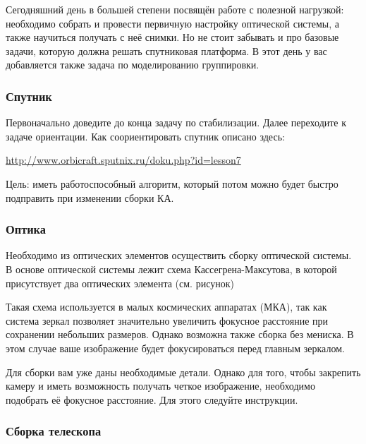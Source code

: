 Сегодняшний день в большей степени посвящён работе с полезной нагрузкой: необходимо собрать и провести первичную настройку оптической системы, а также научиться получать с неё снимки. Но не стоит забывать и про базовые задачи, которую должна решать спутниковая платформа. В этот день у вас добавляется также задача по моделированию группировки.

\subsubsection*{Спутник}

Первоначально доведите до конца задачу по стабилизации. Далее переходите к задаче ориентации. Как соориентировать спутник описано здесь: 

\url{http://www.orbicraft.sputnix.ru/doku.php?id=lesson7}

Цель: иметь работоспособный алгоритм, который потом можно будет быстро подправить при изменении сборки КА.

\subsubsection*{Оптика}

Необходимо из оптических элементов осуществить сборку оптической системы. В основе оптической системы лежит схема Кассегрена-Максутова, в которой присутствует два оптических элемента (см. рисунок)


Такая схема используется в малых космических аппаратах (МКА), так как система зеркал позволяет значительно увеличить фокусное расстояние при сохранении небольших размеров. Однако возможна также сборка без мениска. В этом случае ваше изображение будет фокусироваться перед главным зеркалом.

Для сборки вам уже даны необходимые детали. Однако для того, чтобы закрепить камеру и иметь возможность получать четкое изображение, необходимо подобрать её фокусное расстояние. Для этого следуйте инструкции.

\subsubsection*{Сборка телескопа}

